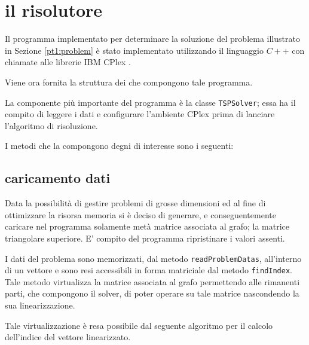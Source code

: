 %
%
\section[Il risolutore]{il risolutore}
\label{pt1:solver}
Il programma implementato per determinare la soluzione del problema illustrato in Sezione \ref{pt1:problem} è stato implementato utilizzando il linguaggio $C++$ con chiamate alle librerie IBM CPlex .

Viene ora fornita la struttura dei  che compongono tale programma.


La componente più importante del programma è la classe \texttt{TSPSolver}; essa ha il compito di leggere i dati e configurare l'ambiente CPlex prima di lanciare l'algoritmo di risoluzione.

I metodi che la compongono degni di interesse sono i seguenti:


\subsection[Caricamento dati]{caricamento dati}
\label{pt1:solver:datas}
Data la possibilità di gestire problemi di grosse dimensioni ed al fine di ottimizzare la risorsa memoria si è deciso di generare, e conseguentemente caricare nel programma  solamente metà matrice associata al grafo; la matrice triangolare superiore. E' compito del programma ripristinare i valori assenti.

I dati del problema sono memorizzati, dal metodo \texttt{readProblemDatas}, all'interno di un vettore e sono resi accessibili in forma matriciale dal metodo \texttt{findIndex}. Tale metodo virtualizza la matrice associata al grafo permettendo alle rimanenti parti, che compongono il solver, di poter operare su tale matrice nascondendo la sua linearizzazione.

Tale virtualizzazione è resa possibile dal seguente algoritmo per il calcolo dell'indice del vettore linearizzato.


